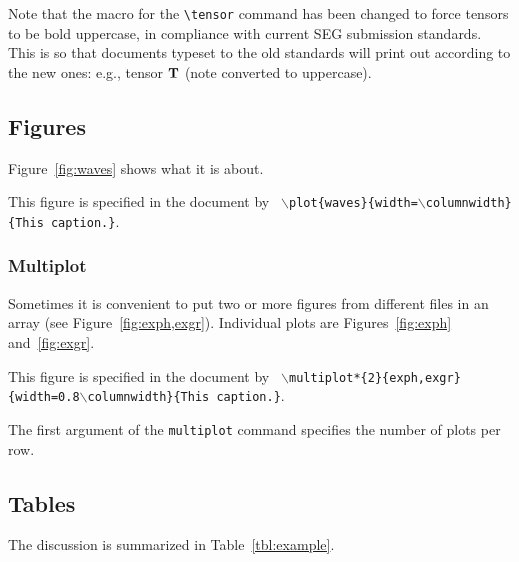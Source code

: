 \documentclass[paper,twocolumn,twoside]{geophysics}
\begin{document}
Note that the macro for the \verb#\tensor# command has been changed to
force tensors to be bold uppercase, in compliance with current SEG
submission standards. This is so that documents typeset to the old
standards will print out according to the new ones: e.g., tensor
$\tensor{t}$ (note converted to uppercase).

\subsection*{Figures}
\renewcommand{\figdir}{Fig} %

Figure~\ref{fig:waves} shows what it is about.

{This figure is specified in the document by \texttt{
    $\backslash$plot\{waves\}\{width=$\backslash$columnwidth\}\{This caption.\}}.
}

\subsubsection{Multiplot} 

Sometimes it is convenient to put two or more figures from different
files in an array (see Figure~\ref{fig:exph,exgr}). Individual plots
are Figures~\ref{fig:exph} and~\ref{fig:exgr}.

{This figure is specified in the document by \newline \texttt{
    $\backslash$multiplot*\{2\}\{exph,exgr\}\{width=0.8$\backslash$co\-lu\-mn\-width\}\{This caption.\}}.
}

The first argument of the \texttt{multiplot} command specifies the
number of plots per row.

\subsection{Tables}

The discussion is summarized in Table~\ref{tbl:example}.
\end{document}
